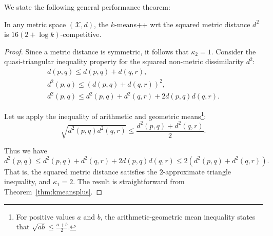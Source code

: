 \documentclass[graybox]{svmult}
\def\calX{\mathcal{X}}
\begin{document}
We state the following general performance theorem:
\begin{theorem}\label{theo:kmms}
In any metric space $(\calX,d)$,
the $k$-means++ wrt the squared metric distance $d^2$ is $16(2+\log k)$-competitive.
\end{theorem}
\begin{proof}
Since a metric distance is symmetric, it follows that $\kappa_2=1$.
Consider the quasi-triangular inequality property for the squared non-metric dissimilarity $d^2$:
\begin{eqnarray*}
d(p,q) \leq d(p,q)+d(q,r),\\
d^2(p,q) \leq (d(p,q)+d(q,r))^2,\\
d^2(p,q) \leq d^2(p,q)+d^2(q,r)+2d(p,q)d(q,r).
\end{eqnarray*}

Let us apply the inequality of arithmetic and geometric means\footnote{For positive values $a$ and $b$,
the arithmetic-geometric mean inequality states that $\sqrt{ab}\leq\frac{a+b}{2}$.}:
\begin{equation*}
\sqrt{d^2(p,q)d^2(q,r)} \leq \frac{d^2(p,q)+d^2(q,r)}{2}.
\end{equation*}

Thus we have
\begin{equation*}
d^2(p,q) \leq d^2(p,q)+d^2(q,r)+2d(p,q)d(q,r)\leq 2(d^2(p,q)+d^2(q,r)).
\end{equation*}
That is, the squared metric distance satisfies the $2$-approximate triangle inequality,
and $\kappa_1=2$. The result is straightforward from Theorem~\ref{thm:kmeansplus}.
\end{proof}
\end{document}
